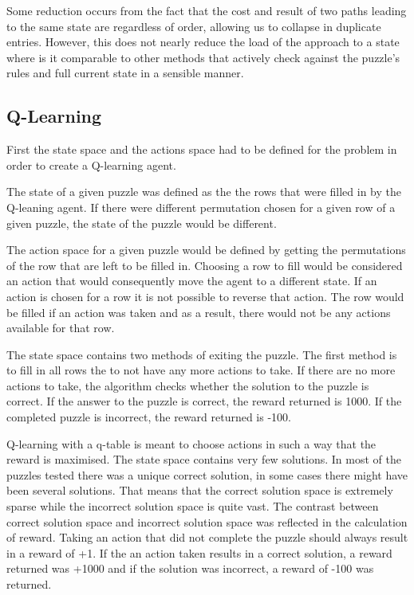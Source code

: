 \documentclass{svproc}
\begin{document}
Some reduction occurs from the fact that the cost and result of two paths leading to the same state are regardless of order, allowing us to collapse in duplicate entries. However, this does not nearly reduce the load of the approach to a state where is it comparable to other methods that actively check against the puzzle's rules and full current state in a sensible manner.

\subsection{Q-Learning}
First the state space and the actions space had to be defined for the problem in order to create a Q-learning agent. 

The state of a given puzzle was defined as the the rows that were filled in by the Q-leaning agent. If there were different permutation chosen for a given row of a given puzzle, the state of the puzzle would be different.

The action space for a given puzzle would be defined by getting the permutations of the row that are left to be filled in. Choosing a row to fill would be considered an action that would consequently move the agent to a different state. If an action is chosen for a row it is not possible to reverse that action. The row would be filled if an action was taken and as a result, there would not be any actions available for that row.

The state space contains two methods of exiting the puzzle. The first method is to fill in all rows the to not have any more actions to take. If there are no more actions to take, the algorithm checks whether the solution to the puzzle is correct. If the answer to the puzzle is correct, the reward returned is 1000. If the completed puzzle is incorrect, the reward returned is -100.

Q-learning with a q-table is meant to choose actions in such a way that the reward is maximised. The state space contains very few solutions. In most of the puzzles tested there was a unique correct solution, in some cases there might have been several solutions. That means that the correct solution space is extremely sparse while the incorrect solution space is quite vast. The contrast between correct solution space and incorrect solution space was reflected in the calculation of reward. Taking an action that did not complete the puzzle should always result in a reward of +1. If the an action taken results in a correct solution, a reward returned was +1000 and if the solution was incorrect, a reward of -100 was returned.
\end{document}
